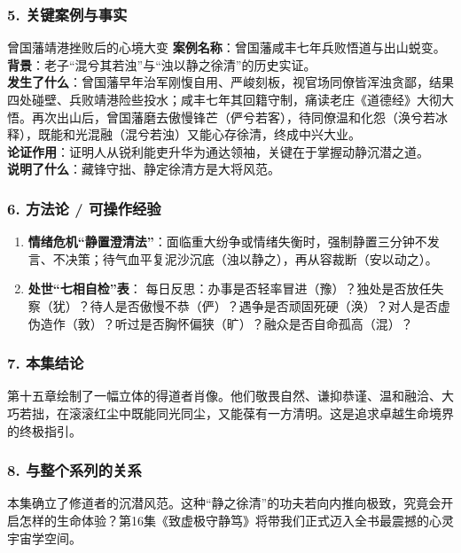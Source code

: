 \subsubsection{5. 关键案例与事实}
\begin{CaseBox}{曾国藩靖港挫败后的心境大变}
\textbf{案例名称}：曾国藩咸丰七年兵败悟道与出山蜕变。\\
\textbf{背景}：老子“混兮其若浊”与“浊以静之徐清”的历史实证。\\
\textbf{发生了什么}：曾国藩早年治军刚愎自用、严峻刻板，视官场同僚皆浑浊贪鄙，结果四处碰壁、兵败靖港险些投水；咸丰七年其回籍守制，痛读老庄《道德经》大彻大悟。再次出山后，曾国藩磨去傲慢锋芒（俨兮若客），待同僚温和化怨（涣兮若冰释），既能和光混融（混兮若浊）又能心存徐清，终成中兴大业。\\
\textbf{论证作用}：证明人从锐利能吏升华为通达领袖，关键在于掌握动静沉潜之道。\\
\textbf{说明了什么}：藏锋守拙、静定徐清方是大将风范。
\end{CaseBox}

\subsubsection{6. 方法论 / 可操作经验}
\begin{enumerate}
    \item \textbf{情绪危机“静置澄清法”}：面临重大纷争或情绪失衡时，强制静置三分钟不发言、不决策；待气血平复泥沙沉底（浊以静之），再从容裁断（安以动之）。
    \item \textbf{处世“七相自检”表}：
    每日反思：办事是否轻率冒进（豫）？独处是否放任失察（犹）？待人是否傲慢不恭（俨）？遇争是否顽固死硬（涣）？对人是否虚伪造作（敦）？听过是否胸怀偏狭（旷）？融众是否自命孤高（混）？
\end{enumerate}

\subsubsection{7. 本集结论}
第十五章绘制了一幅立体的得道者肖像。他们敬畏自然、谦抑恭谨、温和融洽、大巧若拙，在滚滚红尘中既能同光同尘，又能葆有一方清明。这是追求卓越生命境界的终极指引。

\subsubsection{8. 与整个系列的关系}
本集确立了修道者的沉潜风范。这种“静之徐清”的功夫若向内推向极致，究竟会开启怎样的生命体验？第16集《致虚极守静笃》将带我们正式迈入全书最震撼的心灵宇宙学空间。